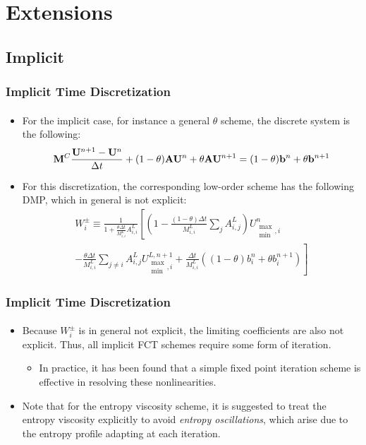 \documentclass{beamer}
\begin{document}
\section{Extensions}
\subsection{Implicit}
\begin{frame}
\frametitle{Implicit Time Discretization}
\framesubtitle{}

\begin{itemize}
   \item For the implicit case, for instance a general $\theta$ scheme, the
      discrete system is the following:
      \begin{equation}
        \mathbf{M}^C\frac{\mathbf{U}^{n+1}-\mathbf{U}^n}{\Delta t}
        + (1-\theta)\mathbf{A}\mathbf{U}^n + \theta\mathbf{A}\mathbf{U}^{n+1}
        = (1-\theta)\mathbf{b}^n + \theta\mathbf{b}^{n+1}
      \end{equation}
   \item For this discretization, the corresponding low-order scheme
      has the following DMP, which in general is not explicit:
      \begin{multline}
         W_i^\pm \equiv \frac{1}{1+\frac{\theta\Delta t}{M_{i,i}^L}A_{i,i}^L}
           \left[\left(1 - \frac{(1-\theta)
           \Delta t}{M_{i,i}^L}\sum\limits_j A_{i,j}^L\right)
           U_{\substack{\max\\\min},i}^n\right.\\\left.
          -\frac{\theta\Delta t}{M_{i,i}^L}\sum\limits_{j\ne i}A_{i,j}^L
           U_{\substack{\max\\\min},i}^{L,n+1}
          +\frac{\Delta t}{M_{i,i}^L}\left((1-\theta)b_i^n
          + \theta b_i^{n+1}\right)\right]
      \end{multline}
\end{itemize}

\end{frame}
\begin{frame}
\frametitle{Implicit Time Discretization}
\framesubtitle{}

\begin{itemize}
   \item Because $W_i^\pm$ is in general not explicit, the limiting coefficients
      are also not explicit. Thus, all implicit FCT schemes require some form
      of iteration.
      \begin{itemize}
         \item In practice, it has been found that a simple fixed point iteration
            scheme is effective in resolving these nonlinearities.
      \end{itemize}
   \item Note that for the entropy viscosity scheme, it is suggested to treat
      the entropy viscosity explicitly to avoid \emph{entropy oscillations},
      which arise due to the entropy profile adapting at each iteration.
\end{itemize}

\end{frame}
\end{document}
